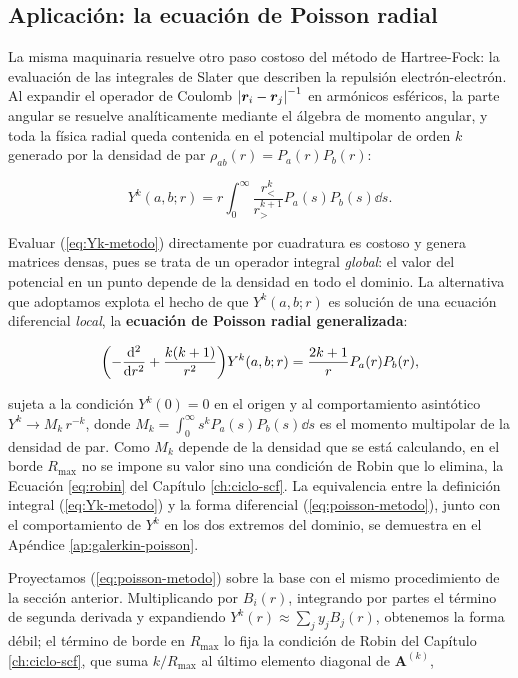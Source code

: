 \subsection{Aplicación: la ecuación de Poisson radial}
\label{subsec:poisson-metodo}

La misma maquinaria resuelve otro paso costoso del método de Hartree-Fock: la evaluación de las integrales de Slater que describen la repulsión electrón-electrón. Al expandir el operador de Coulomb $\abs{\bm{r}_i - \bm{r}_j}^{-1}$ en armónicos esféricos, la parte angular se resuelve analíticamente mediante el álgebra de momento angular, y toda la física radial queda contenida en el potencial multipolar de orden $k$ generado por la densidad de par $\rho_{ab}(r) = P_a(r)P_b(r)$:

\begin{equation}
\label{eq:Yk-metodo}
  Y^k(a,b;r) = r \int_0^\infty \frac{r_{<}^k}{r_{>}^{k+1}} P_a(s) P_b(s) \dd{s}.
\end{equation}

Evaluar (\ref{eq:Yk-metodo}) directamente por cuadratura es costoso y genera matrices densas, pues se trata de un operador integral \textit{global}: el valor del potencial en un punto depende de la densidad en todo el dominio. La alternativa que adoptamos explota el hecho de que $Y^k(a,b;r)$ es solución de una ecuación diferencial \textit{local}, la \textbf{ecuación de Poisson radial generalizada}:

\begin{equation}
\label{eq:poisson-metodo}
  \qty( -\dv[2]{r} + \frac{k(k+1)}{r^2} ) Y^k(a,b;r) = \frac{2k+1}{r} P_a(r) P_b(r),
\end{equation}

sujeta a la condición $Y^k(0) = 0$ en el origen y al comportamiento asintótico $Y^k \to M_k\,r^{-k}$, donde $M_k = \int_0^\infty s^k P_a(s)P_b(s) \dd{s}$ es el momento multipolar de la densidad de par. Como $M_k$ depende de la densidad que se está calculando, en el borde $R_{\text{max}}$ no se impone su valor sino una condición de Robin que lo elimina, la Ecuación \eqref{eq:robin} del Capítulo \ref{ch:ciclo-scf}. La equivalencia entre la definición integral (\ref{eq:Yk-metodo}) y la forma diferencial (\ref{eq:poisson-metodo}), junto con el comportamiento de $Y^k$ en los dos extremos del dominio, se demuestra en el Apéndice \ref{ap:galerkin-poisson}.

Proyectamos (\ref{eq:poisson-metodo}) sobre la base con el mismo procedimiento de la sección anterior. Multiplicando por $B_i(r)$, integrando por partes el término de segunda derivada y expandiendo $Y^k(r) \approx \sum_j y_j B_j(r)$, obtenemos la forma débil; el término de borde en $R_{\text{max}}$ lo fija la condición de Robin del Capítulo \ref{ch:ciclo-scf}, que suma $k/R_{\text{max}}$ al último elemento diagonal de $\bm{A}^{(k)}$,


